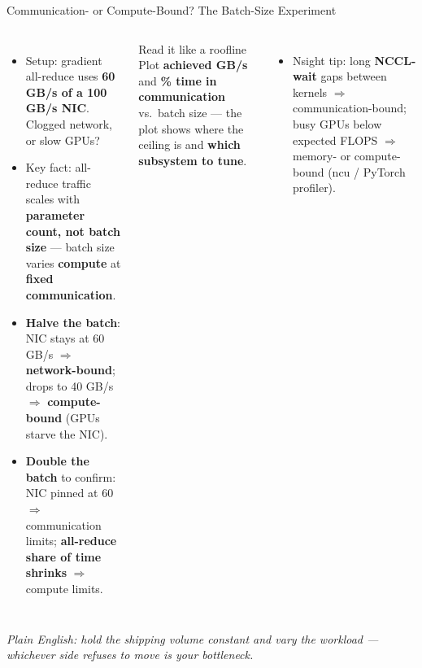 \documentclass[aspectratio=169]{beamer}
\newcommand{\kw}[1]{\textbf{\textcolor{kwblue}{#1}}}
\newcommand{\pe}[1]{\par{\setlength{\fboxsep}{2.5pt}\noindent\colorbox{navy!9}{\parbox{\dimexpr\textwidth-5pt\relax}{\footnotesize\itshape Plain English: #1}}}}
\begin{document}
\begin{frame}{Communication- or Compute-Bound? The Batch-Size Experiment}
  \begin{columns}[t]
    \begin{itemize}\small
      \item Setup: gradient all-reduce uses \kw{60 GB/s of a 100 GB/s NIC}. Clogged
            network, or slow GPUs?
      \item Key fact: all-reduce traffic scales with \kw{parameter count, not batch size}
            --- batch size varies \kw{compute} at \kw{fixed communication}.
      \item \kw{Halve the batch}: NIC stays at 60 GB/s $\Rightarrow$ \kw{network-bound};
            drops to 40 GB/s $\Rightarrow$ \kw{compute-bound} (GPUs starve the NIC).
      \item \kw{Double the batch} to confirm: NIC pinned at 60 $\Rightarrow$ communication
            limits; \kw{all-reduce share of time shrinks} $\Rightarrow$ compute limits.
    \end{itemize}
    \begin{block}{Read it like a roofline}
      \small Plot \kw{achieved GB/s} and \kw{\% time in communication} vs.\ batch size ---
      the plot shows where the ceiling is and \kw{which subsystem to tune}.
    \end{block}
    \begin{itemize}\small
      \item Nsight tip: long \kw{NCCL-wait} gaps between kernels $\Rightarrow$
            communication-bound; busy GPUs below expected FLOPS $\Rightarrow$
            memory- or compute-bound (ncu / PyTorch profiler).
    \end{itemize}
  \end{columns}
  \pe{hold the shipping volume constant and vary the workload --- whichever side refuses to move is your bottleneck.}
\end{frame}
\end{document}
